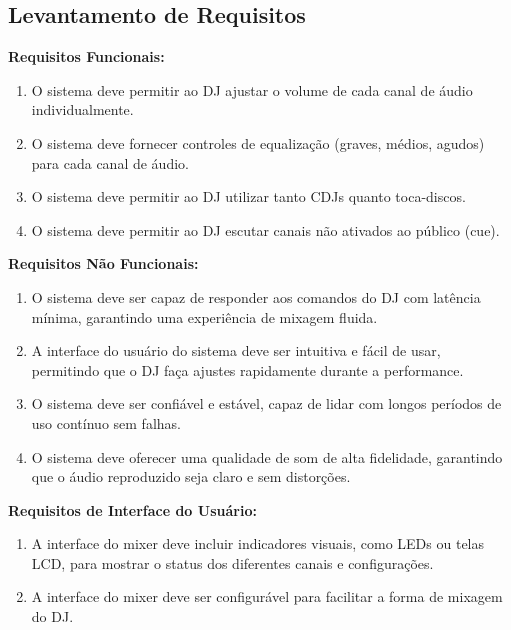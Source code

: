 \subsection{Levantamento de Requisitos}
\textbf{Requisitos Funcionais:}
\begin{enumerate}[label=\textbullet]
\item O sistema deve permitir ao DJ ajustar o volume de cada canal de áudio individualmente.
\item O sistema deve fornecer controles de equalização (graves, médios, agudos) para cada canal de áudio.
\item O sistema deve permitir ao DJ utilizar tanto CDJs quanto toca-discos.
\item O sistema deve permitir ao DJ escutar canais não ativados ao público (cue).

\end{enumerate}

\textbf{Requisitos Não Funcionais:}
\begin{enumerate}[label=\textbullet]
\item O sistema deve ser capaz de responder aos comandos do DJ com latência mínima, garantindo uma experiência de mixagem fluida.
\item A interface do usuário do sistema deve ser intuitiva e fácil de usar, permitindo que o DJ faça ajustes rapidamente durante a performance.
\item O sistema deve ser confiável e estável, capaz de lidar com longos períodos de uso contínuo sem falhas.
\item O sistema deve oferecer uma qualidade de som de alta fidelidade, garantindo que o áudio reproduzido seja claro e sem distorções.
\end{enumerate}

\textbf{Requisitos de Interface do Usuário:}
\begin{enumerate}[label=\textbullet]
\item A interface do mixer deve incluir indicadores visuais, como LEDs ou telas LCD, para mostrar o status dos diferentes canais e configurações.
\item  A interface do mixer deve ser configurável para facilitar a forma de mixagem do DJ.
\end{enumerate}

